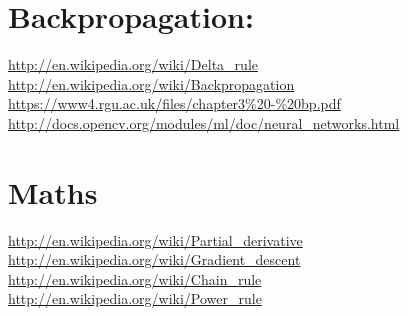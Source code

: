 \section{Backpropagation:}
\url{http://en.wikipedia.org/wiki/Delta_rule} \\
\url{http://en.wikipedia.org/wiki/Backpropagation} \\ 
\url{https://www4.rgu.ac.uk/files/chapter3\%20-\%20bp.pdf} \\ 
\url{http://docs.opencv.org/modules/ml/doc/neural_networks.html} \\ 


\section{Maths}
\url{http://en.wikipedia.org/wiki/Partial_derivative} \\
\url{http://en.wikipedia.org/wiki/Gradient_descent} \\
\url{http://en.wikipedia.org/wiki/Chain_rule} \\
\url{http://en.wikipedia.org/wiki/Power_rule} \\

